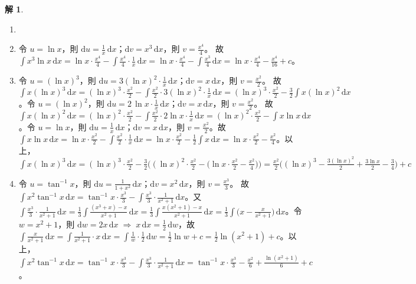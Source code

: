 \documentclass[12pt]{extarticle}
\newcommand{\ds}{\displaystyle}
\newcommand{\ie}{\;\Longrightarrow\;}
\theoremstyle{definition}
\newtheorem*{sol}{解}
\begin{document}
\begin{sol}
  \begin{enumerate}\setlength{\itemsep}{0pt}
    \item[]
    \item 令 $\ds u = \ln x$，則 $\ds\text{d}u = \frac{1}{x}\,\text{d}x$；$\ds\text{d}v = x^3\,\text{d}x$，則 $\ds v = \frac{x^4}{4}$。 故 $\ds\int x^3\ln x\,\mathrm{d}x = \ln x\cdot\frac{x^4}{4} - \int\!\frac{x^4}{4}\cdot\frac{1}{x}\,\text{d}x = \ln x\cdot\frac{x^4}{4} - \int\!\frac{x^3}{4}\,\text{d}x = \ln x\cdot\frac{x^4}{4} - \frac{x^4}{16} + c$。  
    \item 令 $\ds u = (\ln x)^3$，則 $\ds\text{d}u = 3(\ln x)^2\cdot\frac{1}{x}\,\text{d}x$；$\ds\text{d}v = x\,\text{d}x$，則 $\ds v = \frac{x^2}{2}$。 故 $\ds\int x(\ln x)^3\,\mathrm{d}x = (\ln x)^3\cdot\frac{x^2}{2} - \int\!\frac{x^2}{2}\cdot 3(\ln x)^2\cdot\frac{1}{x}\,\text{d}x = (\ln x)^3\cdot\frac{x^2}{2} - \frac{3}{2}\int x(\ln x)^2\,\text{d}x$。令 $\ds u = (\ln x)^2$，則 $\ds\text{d}u = 2\,\ln x\cdot\frac{1}{x}\,\text{d}x$；$\ds\text{d}v = x\,\text{d}x$，則 $\ds v = \frac{x^2}{2}$。 故 $\ds\int x(\ln x)^2\,\text{d}x = (\ln x)^2\cdot\frac{x^2}{2} - \int\!\frac{x^2}{2}\cdot 2\ln x\cdot\frac{1}{x}\,\text{d}x = (\ln x)^2\cdot\frac{x^2}{2} - \int x\ln x\,\text{d}x$。令 $\ds u = \ln x$，則 $\ds\text{d}u = \frac{1}{x}\,\text{d}x$；$\ds\text{d}v = x\,\text{d}x$，則 $\ds v = \frac{x^2}{2}$。故 $\ds\int x\ln x\,\text{d}x = \ln x\cdot\frac{x^2}{2} - \int\!\frac{x^2}{2}\cdot\frac{1}{x}\,\text{d}x = \ln x\cdot\frac{x^2}{2} - \frac{1}{2}\int x\,\text{d}x = \ln x\cdot\frac{x^2}{2} - \frac{x^2}{4}$。以上，$\ds\int x(\ln x)^3\,\mathrm{d}x = (\ln x)^3\cdot\frac{x^2}{2} - \frac{3}{2}\Big((\ln x)^2\cdot\frac{x^2}{2} - \big(\ln x\cdot\frac{x^2}{2} - \frac{x^2}{4}\big)\Big) = \frac{x^2}{2}\big((\ln x)^3 - \frac{3(\ln x)^2}{2} + \frac{3\ln x}{2} - \frac{3}{4}\big) + c$
    \item 令 $\ds u = \tan^{-1} x$，則 $\ds\text{d}u = \frac{1}{1 + x^2}\,\text{d}x$；$\ds\text{d}v = x^2\,\text{d}x$，則 $\ds v = \frac{x^3}{3}$。 故 $\ds\int x^2\tan^{-1} x\,\mathrm{d}x = \tan^{-1}x\cdot\frac{x^3}{3} - \int\!\frac{x^3}{3}\cdot\frac{1}{x^2 + 1}\,\text{d}x$。又 $\ds\int\!\frac{x^3}{3}\cdot\frac{1}{x^2 + 1}\,\text{d}x = \frac{1}{3}\int\!\frac{(x^3 + x) - x}{x^2 + 1}\,\text{d}x = \frac{1}{3}\int\!\frac{x(x^2 + 1) - x}{x^2 + 1}\,\text{d}x = \frac{1}{3}\int\!\big(x - \frac{x}{x^2 + 1}\big)\,\text{d}x$。令 $\ds w = x^2 + 1$，則 $\ds\text{d}w = 2x\,\text{d}x\ie x\,\text{d}x = \frac{1}{2}\,\text{d}w$，故 $\ds\int\!\frac{x}{x^2 + 1}\,\text{d}x = \int\!\frac{1}{x^2 + 1}\cdot x\,\text{d}x = \int\!\frac{1}{w}\cdot\frac{1}{2}\,\text{d}w = \frac{1}{2}\ln w + c = \frac{1}{2}\ln(x^2 + 1) + c$。以上，$\ds\int x^2\tan^{-1} x\,\mathrm{d}x = \tan^{-1}x\cdot\frac{x^3}{3} - \int\!\frac{x^3}{3}\cdot\frac{1}{x^2 + 1}\,\text{d}x = \tan^{-1}x\cdot\frac{x^3}{3} - \frac{x^2}{6} + \frac{\ln(x^2 + 1)}{6} + c$。

\end{enumerate}
\end{sol}
\end{document}
